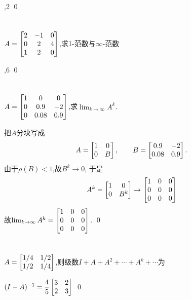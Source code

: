 \documentclass{matrix-homework}
\begin{document}
,2
\qed


\section{}
$A=\begin{bmatrix}2&-1&0\\ 0&2&4 \\ 1&2&0\end{bmatrix}$,求1-范数与$\infty$-范数

,6
\qed


\section{}
$A=\begin{bmatrix}1 & 0 & 0 \\ 0 & 0.9 & -2 \\ 0 & 0.08 & 0.9\end{bmatrix}$,求$\lim_{k\to\infty}A^k$.

\answer
把$A$分块写成
$$A=\begin{bmatrix}1&0\\0&B\end{bmatrix},\qquad B=\begin{bmatrix}0.9&-2\\0.08&0.9\end{bmatrix}.$$
由于$\rho(B)<1$,故$B^k\to0$, 于是
$$A^k=\begin{bmatrix}1&0\\0&B^k\end{bmatrix}\to\begin{bmatrix}1&0&0\\0&0&0\\0&0&0\end{bmatrix}$$
故$\lim_{k\to\infty}A^k=\begin{bmatrix}1&0&0\\0&0&0\\0&0&0\end{bmatrix}$.
\qed


\section{}
$A=\begin{bmatrix}1/4 & 1/2 \\ 1/2 & 1/4\end{bmatrix}$,则级数$I+A+A^2+\cdots+A^k+\cdots$为

\answer
$(I-A)^{-1}=\dfrac{4}{5}\begin{bmatrix}3&2\\2&3\end{bmatrix}$
\qed
\end{document}
